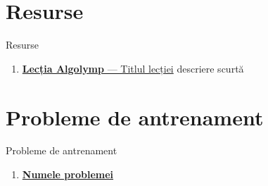\documentclass{beamer}
\begin{document}
\section{Resurse}

\begin{frame}[t]{Resurse}
  \begin{enumerate}
    \item \href{URL}{\textbf{Lecția Algolymp} --- Titlul lecției}
          \textemdash{} descriere scurtă
  \end{enumerate}
\end{frame}

\section{Probleme de antrenament}

\begin{frame}[t]{Probleme de antrenament}
  \begin{enumerate}
    \item \href{URL}{\textbf{Numele problemei}}
  \end{enumerate}
\end{frame}
\end{document}
